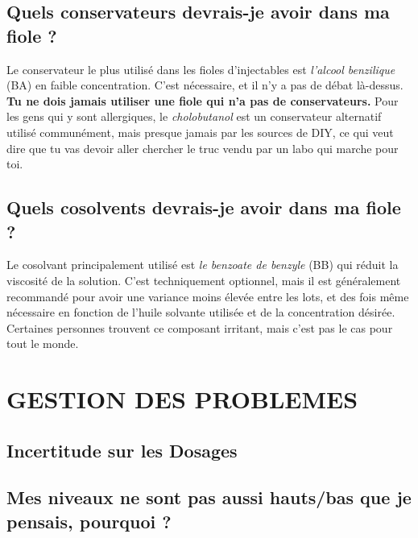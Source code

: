 \documentclass{article}
\begin{document}
\subsection{Quels conservateurs devrais-je avoir dans ma fiole ?}\label{6-17}

Le conservateur le plus utilisé dans les fioles d'injectables est \textit{l'alcool benzilique} (BA) en faible concentration. C'est nécessaire, et il n'y a pas de débat là-dessus. \textbf{Tu ne dois jamais utiliser une fiole qui n'a pas de conservateurs.} Pour les gens qui y sont allergiques, le \textit{cholobutanol} est un conservateur alternatif utilisé communément, mais presque jamais par les sources de DIY, ce qui veut dire que tu vas devoir aller chercher le truc vendu par un labo qui marche pour toi. 

\subsection{Quels cosolvents devrais-je avoir dans ma fiole ?}

Le cosolvant principalement utilisé est \textit{le benzoate de benzyle} (BB) qui réduit la viscosité de la solution. C'est techniquement optionnel, mais il est généralement recommandé pour avoir une variance moins élevée entre les lots, et des fois même nécessaire en fonction de l'huile solvante utilisée et de la concentration désirée. Certaines personnes trouvent ce composant irritant, mais c'est pas le cas pour tout le monde.
 

\section{GESTION DES PROBLEMES}

\subsection*{Incertitude sur les Dosages}

\subsection{Mes niveaux ne sont pas aussi hauts/bas que je pensais, pourquoi ?}
\end{document}
